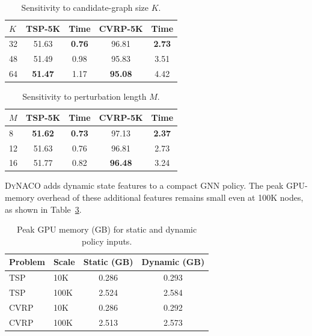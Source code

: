 \documentclass[journal]{IEEEtai}
\newcommand{\DyNACO}{\textsc{DyNACO}}
\begin{document}
\begin{table}[t]
\centering
\caption{Sensitivity to candidate-graph size $K$.}
\label{tab:k-sensitivity-app}
\small
\renewcommand{\arraystretch}{0.85}
\begin{tabular*}{\columnwidth}{@{\extracolsep{\fill}}lcccc@{}}
\toprule
$K$ & TSP-5K & Time & CVRP-5K & Time \\
\midrule
32 & 51.63 & \textbf{0.76} & 96.81 & \textbf{2.73} \\
48 & 51.49 & 0.98 & 95.83 & 3.51 \\
64 & \textbf{51.47} & 1.17 & \textbf{95.08} & 4.42 \\
\bottomrule
\end{tabular*}
\end{table}

\begin{table}[t]
\centering
\caption{Sensitivity to perturbation length $M$.}
\label{tab:m-sensitivity-app}
\small
\renewcommand{\arraystretch}{0.85}
\begin{tabular*}{\columnwidth}{@{\extracolsep{\fill}}lcccc@{}}
\toprule
$M$ & TSP-5K & Time & CVRP-5K & Time \\
\midrule
8 & \textbf{51.62} & \textbf{0.73} & 97.13 & \textbf{2.37} \\
12 & 51.63 & 0.76 & 96.81 & 2.73 \\
16 & 51.77 & 0.82 & \textbf{96.48} & 3.24 \\
\bottomrule
\end{tabular*}
\end{table}

\DyNACO{} adds dynamic state features to a compact GNN policy. The peak GPU-memory overhead of these additional features remains small even at 100K nodes, as shown in Table~\ref{tab:feature-memory-app}.

\begin{table}[t]
\centering
\caption{Peak GPU memory (GB) for static and dynamic policy inputs.}
\label{tab:feature-memory-app}
\small
\renewcommand{\arraystretch}{0.85}
\begin{tabular*}{\columnwidth}{@{\extracolsep{\fill}}llcc@{}}
\toprule
Problem & Scale & Static (GB) & Dynamic (GB) \\
\midrule
TSP & 10K & 0.286 & 0.293 \\
TSP & 100K & 2.524 & 2.584 \\
CVRP & 10K & 0.286 & 0.292 \\
CVRP & 100K & 2.513 & 2.573 \\
\bottomrule
\end{tabular*}
\end{table}
\end{document}
